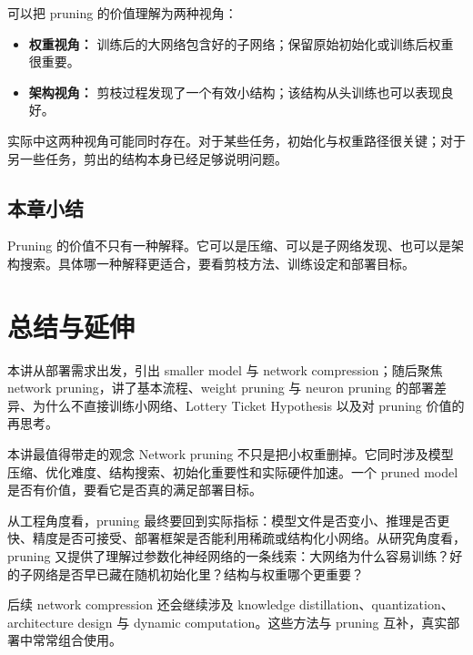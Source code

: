 \documentclass[a4paper]{article}
\begin{document}
可以把 pruning 的价值理解为两种视角：
\begin{itemize}
    \item \textbf{权重视角：} 训练后的大网络包含好的子网络；保留原始初始化或训练后权重很重要。
    \item \textbf{架构视角：} 剪枝过程发现了一个有效小结构；该结构从头训练也可以表现良好。
\end{itemize}
实际中这两种视角可能同时存在。对于某些任务，初始化与权重路径很关键；对于另一些任务，剪出的结构本身已经足够说明问题。

\subsection{本章小结}

Pruning 的价值不只有一种解释。它可以是压缩、可以是子网络发现、也可以是架构搜索。具体哪一种解释更适合，要看剪枝方法、训练设定和部署目标。

\section{总结与延伸}

本讲从部署需求出发，引出 smaller model 与 network compression；随后聚焦 network pruning，讲了基本流程、weight pruning 与 neuron pruning 的部署差异、为什么不直接训练小网络、Lottery Ticket Hypothesis 以及对 pruning 价值的再思考。

\begin{importantbox}{本讲最值得带走的观念}
    Network pruning 不只是把小权重删掉。它同时涉及模型压缩、优化难度、结构搜索、初始化重要性和实际硬件加速。一个 pruned model 是否有价值，要看它是否真的满足部署目标。
\end{importantbox}

从工程角度看，pruning 最终要回到实际指标：模型文件是否变小、推理是否更快、精度是否可接受、部署框架是否能利用稀疏或结构化小网络。从研究角度看，pruning 又提供了理解过参数化神经网络的一条线索：大网络为什么容易训练？好的子网络是否早已藏在随机初始化里？结构与权重哪个更重要？

后续 network compression 还会继续涉及 knowledge distillation、quantization、architecture design 与 dynamic computation。这些方法与 pruning 互补，真实部署中常常组合使用。
\end{document}
